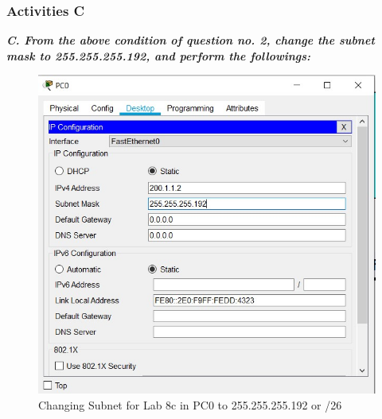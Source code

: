 \documentclass[a4paper,11pt]{article}
\begin{document}
%

%

%



\subsubsection{Activities C}

{\bfseries \textit{C. From the above condition of question no. 2, change the subnet mask to 255.255.255.192, and
        perform the followings:}}


\begin{figure}[H]
    \centering
    \includegraphics[scale=0.82,cframe=blue 0.5pt 3pt]{./FIG/C_SP0.jpg}
    \caption{Changing Subnet for Lab 8c in PC0 to 255.255.255.192 or /26 }
\end{figure}
\end{document}
